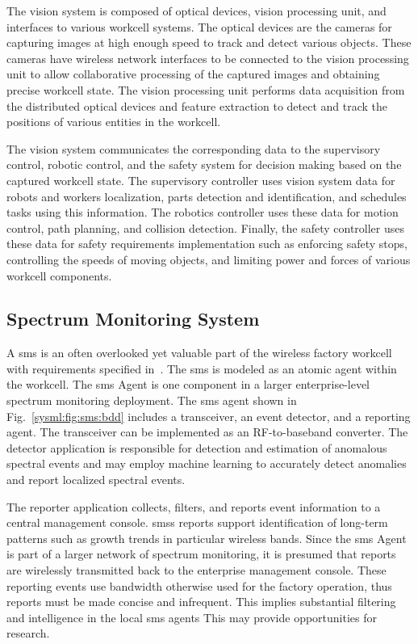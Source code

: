 The vision system is composed of optical devices, vision processing unit, and interfaces to various workcell systems. The optical devices are the cameras for capturing images at high enough speed to track and detect various objects. These cameras have wireless network interfaces to be connected to the vision processing unit to allow collaborative processing of the captured images and obtaining precise workcell state. The vision processing unit performs data acquisition from the distributed optical devices and feature extraction to detect and track the positions of various entities in the workcell. 

The vision system communicates the corresponding data to the supervisory control, robotic control, and the safety system for decision making based on the captured workcell state. The supervisory controller uses vision system data for robots and workers localization, parts detection and identification, and schedules tasks using this information. The robotics controller uses these data for motion control, path planning, and collision detection. Finally, the safety controller uses these data for safety requirements implementation such as enforcing safety stops, controlling the speeds of moving objects, and limiting power and forces of various workcell components.    

\subsection{Spectrum Monitoring System}\label{sysml:sec:sms}
A \gls{sms} is an often overlooked yet valuable part of the wireless factory workcell with requirements specified in~\cite{Candell2017.SMS}.  The \gls{sms} is modeled as an atomic agent within the workcell.  The \gls{sms} Agent is one component in a larger enterprise-level spectrum monitoring deployment.  The \gls{sms} agent shown in Fig.~\ref{sysml:fig:sms:bdd} includes a transceiver, an event detector, and a reporting agent.  The transceiver can be implemented as an RF-to-baseband converter.  The detector application is responsible for detection and estimation of anomalous spectral events and may employ machine learning to accurately detect anomalies and report localized spectral events.

The reporter application collects, filters, and reports event information to a central management console.  \Glspl{sms} reports support identification of long-term patterns such as growth trends in particular wireless bands.  Since the \gls{sms} Agent is part of a larger network of spectrum monitoring, it is presumed that reports are wirelessly transmitted back to the enterprise management console.  These reporting events use bandwidth otherwise used for the factory operation, thus reports must be made concise and infrequent.  This implies substantial filtering and intelligence in the local \gls{sms} agents This may provide opportunities for research.

